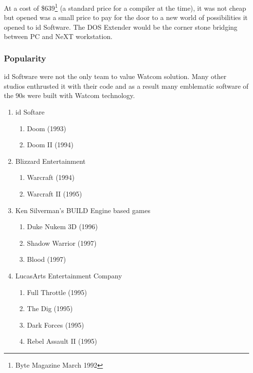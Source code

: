 At a cost of \$639\footnote{Byte Magazine March 1992} (a standard price for a compiler at the time), it was not cheap but opened was a small price to pay for the door to a new world of possibilities it opened to id Software. The DOS Extender would be the corner stone bridging between PC and NeXT workstation.\\

\subsubsection{Popularity}
id Software were not the only team to value Watcom solution. Many other studios enthrusted it with their code and as a result many emblematic software of the 90s were built with Watcom technology.\\
\begin{enumerate}
\item id Softare 
       \begin{enumerate}
       \item Doom (1993)
       \item Doom II (1994)
       \end{enumerate} 
\item Blizzard Entertainment 
       \begin{enumerate}
       \item Warcraft (1994)
       \item Warcraft II (1995)
       \end{enumerate}
\item Ken Silverman's BUILD Engine based games
      \begin{enumerate}
       \item Duke Nukem 3D (1996)
       \item Shadow Warrior (1997)
       \item Blood (1997)
       \end{enumerate}
\item LucasArts Entertainment Company
      \begin{enumerate}
       \item Full Throttle (1995)
       \item The Dig (1995)
       \item Dark Forces  (1995)
       \item Rebel Assault II  (1995)    
      \end{enumerate}
\end{enumerate}
\par
